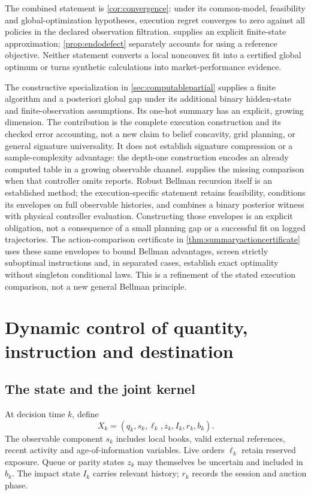 \documentclass[11pt]{article}
\numberwithin{equation}{section}
\theoremstyle{definition}
\theoremstyle{remark}
\theoremstyle{definition}
\begin{document}
The combined statement is \cref{cor:convergence}: under its common-model,
feasibility and global-optimization hypotheses, execution regret converges
to zero against all policies in the declared observation filtration.
 supplies an explicit finite-state approximation;
\cref{prop:endodefect} separately accounts for using a reference objective.
Neither statement converts a local nonconvex fit into a certified global
optimum or turns synthetic calculations into market-performance evidence.

The constructive specialization in \cref{sec:computablepartial} supplies a
finite algorithm and a posteriori global gap under its additional binary
hidden-state and finite-observation assumptions. Its one-hot summary has an
explicit, growing dimension. The contribution is the complete execution
construction and its checked error accounting, not a new claim to belief
concavity, grid planning, or general signature universality.
It does not establish signature compression or a sample-complexity advantage:
the depth-one construction encodes an already computed table in a growing
observable channel.  supplies the missing comparison
when that controller omits reports. Robust Bellman recursion itself is an
established method; the execution-specific statement retains feasibility,
conditions its envelopes on full observable histories, and combines a
binary posterior witness with physical controller evaluation. Constructing
those envelopes is an explicit obligation, not a consequence of a small
planning gap or a successful fit on logged trajectories.
The action-comparison certificate in \cref{thm:summaryactioncertificate}
uses these same envelopes to bound Bellman advantages, screen strictly
suboptimal instructions and, in separated cases, establish exact optimality
without singleton conditional laws. This is a refinement of the stated
execution comparison, not a new general Bellman principle.


\section{Dynamic control of quantity, instruction and destination}\label{sec:dp}

\subsection{The state and the joint kernel}

At decision time $k$, define
\begin{equation}\label{eq:state}
 X_k=(q_k,s_k,\ell_k,z_k,I_k,r_k,b_k).
\end{equation}
The observable component $s_k$ includes local books, valid external references,
recent activity and age-of-information variables. Live orders $\ell_k$ retain
reserved exposure. Queue or parity states $z_k$ may themselves be uncertain
and included in $b_k$. The impact state $I_k$ carries relevant history; $r_k$
records the session and auction phase.
\end{document}
